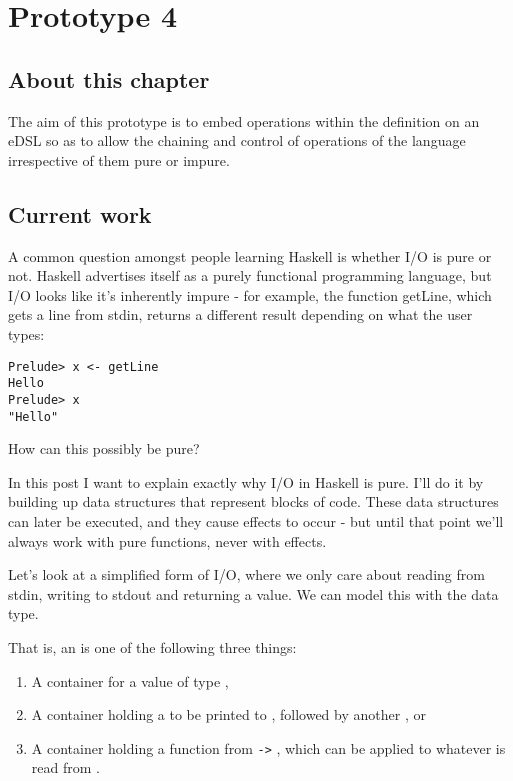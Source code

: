 \documentclass[thesis-solanki.tex]{subfiles}
\begin{document}
\chapter{Prototype 4}{\label{proto4}}


\section{About this chapter}
The aim of this prototype is to embed  operations within the definition on an eDSL so as to allow the chaining and control 
of operations of the language irrespective of them pure or impure.

\section{Current work}

\cite{website:ioispurechristaylor}

A common question amongst people learning Haskell is whether I/O is pure or not. Haskell advertises itself as a purely functional 
programming language, but I/O looks like it's inherently impure - for example, the function getLine, which gets a line from stdin, returns 
a different result depending on what the user types:



\begin{code-list}[H]
\begin{singlespace}
\begin{verbatim}
Prelude> x <- getLine
Hello
Prelude> x
"Hello"
\end{verbatim}
\end{singlespace}
\caption{}
\label{}
\end{code-list}
How can this possibly be pure?

In this post I want to explain exactly why I/O in Haskell is pure. I'll do it by building up data structures that represent blocks of code. 
These data structures can later be executed, and they cause effects to occur - but until that point we'll always work with pure functions, 
never with effects.

Let's look at a simplified form of I/O, where we only care about reading from stdin, writing to stdout and returning a value. We can model 
this with the  data type.

That is, an  is one of the following three things:
\begin{enumerate}
\item A container for a value of type ,

\item A container holding a  to be printed to ,
  followed by another , or

\item A container holding a function from  \Verb!->! , which can be applied
  to whatever  is read from . 
\end{enumerate}
\end{document}
